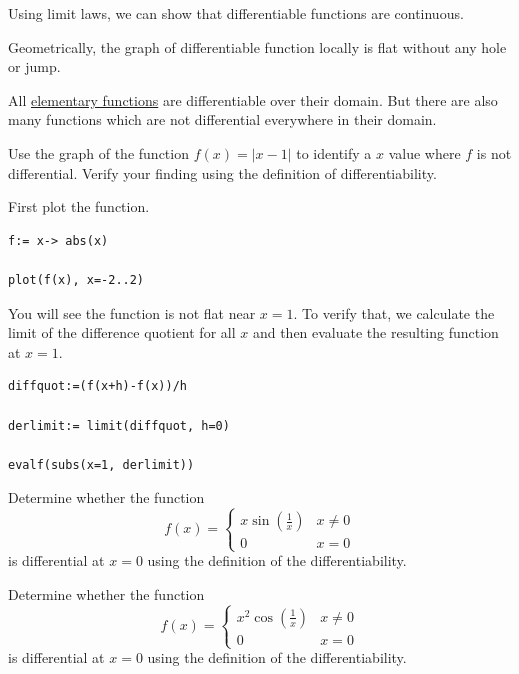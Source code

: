 \documentclass[]{book}
\theoremstyle{definition}
\theoremstyle{definition}
\theoremstyle{definition}
\theoremstyle{remark}
\let\BeginKnitrBlock\begin \let\EndKnitrBlock\end
\begin{document}
Using limit laws, we can show that differentiable functions are continuous.

Geometrically, the graph of differentiable function locally is flat without any hole or jump.

All \href{https://en.wikipedia.org/wiki/Elementary_function}{elementary functions} are differentiable over their domain. But there are also many functions which are not differential everywhere in their domain.

\BeginKnitrBlock{example}
\protect\hypertarget{exm:unnamed-chunk-1}{}{\label{exm:unnamed-chunk-1} }
Use the graph of the function \(f(x)=|x-1|\) to identify a \(x\) value where \(f\) is not differential. Verify your finding using the definition of differentiability.
\EndKnitrBlock{example}

\BeginKnitrBlock{solution}
{}
First plot the function.

\begin{verbatim}
f:= x-> abs(x)

plot(f(x), x=-2..2)
\end{verbatim}

You will see the function is not flat near \(x=1\). To verify that, we calculate the limit of the difference quotient for all \(x\) and then evaluate the resulting function at \(x=1\).

\begin{verbatim}
diffquot:=(f(x+h)-f(x))/h

derlimit:= limit(diffquot, h=0)

evalf(subs(x=1, derlimit))
\end{verbatim}
\EndKnitrBlock{solution}

\BeginKnitrBlock{exercise}
\protect\hypertarget{exr:unnamed-chunk-3}{}{\label{exr:unnamed-chunk-3} }
Determine whether the function
\[
f(x)=\begin{cases}
x\sin\left(\frac1x\right) & x\neq 0\\
0 & x=0
\end{cases}
\]
is differential at \(x=0\) using the definition of the differentiability.
\EndKnitrBlock{exercise}

\BeginKnitrBlock{exercise}
\protect\hypertarget{exr:unnamed-chunk-4}{}{\label{exr:unnamed-chunk-4} }
Determine whether the function
\[
f(x)=\begin{cases}
x^2\cos\left(\frac1x\right) & x\neq 0\\
0 & x=0
\end{cases}
\]
is differential at \(x=0\) using the definition of the differentiability.
\EndKnitrBlock{exercise}
\end{document}
